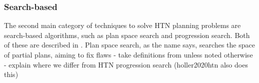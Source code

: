 \begin{comment}
- may translate to classical planning \cite{alford2016bound}
- SAT-based has been known since 1998 \cite{mali1998encoding}
- tend to explore the hierarchy layer-by-layer \cite{schreiber2019tree}
- this gives the search a BFS-like characteristic
- this is needed, as SAT is NP-complete compared to HTN which is undecidable and TOHTN which is in D-EXPTIME \ref{prelim: tohtn complexity}
- encoding the whole instance would be impossible in case of HTN and lead to blowup in instance size in case of TOHTN
- going bit by bit is done instead

- example planners are Tree-REX \cite{schreiber2019tree}, totSAT \cite{behnke2018totsat}, Lilotane \cite{schreiber2021lilotane}
\end{comment}

\subsubsection{Search-based}
\label{prelim: techniques search}
The second main category of techniques to solve HTN planning problems are search-based algorithms, such as plan space search and progression search. Both of these are described in \cite{holler2020htn}. Plan space search, as the name says, searches the space of partial plans, aiming to fix flaws 
- take definitions from \cite{holler2020htn} unless noted otherwise
- explain where we differ from HTN progression search (holler2020htn also does this)

